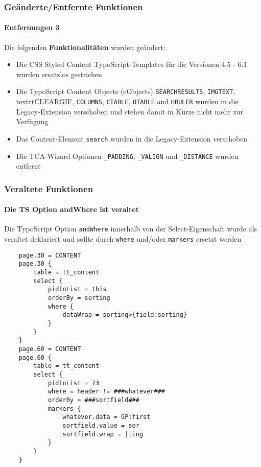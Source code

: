 \begin{frame}[fragile]
	\frametitle{Geänderte/Entfernte Funktionen}
	\framesubtitle{Entfernungen 3}

	Die folgenden \textbf{Funktionalitäten} wurden geändert:

	\begin{itemize}
		\item Die CSS Styled Content TypoScript-Templates für die Versionen 4.5 - 6.1 wurden ersatzlos gestrichen

		\item Die TypoScript Content Objects (cObjects) \texttt{SEARCHRESULTS}, \texttt{IMGTEXT}, texttt{CLEARGIF}, \texttt{COLUMNS}, \texttt{CTABLE}, \texttt{OTABLE} and \texttt{HRULER} wurden in die Legacy-Extension  verschoben und stehen damit in Kürze nicht mehr zur Verfügung

		\item Das Content-Element \texttt{search} wurden in die Legacy-Extension  verschoben

		\item Die TCA-Wizard Optionen \texttt{\_PADDING}, \texttt{\_VALIGN} und \texttt{\_DISTANCE} wurden entfernt
	\end{itemize}

\end{frame}


\begin{frame}[fragile]
	\frametitle{Veraltete Funktionen}
	\framesubtitle{Die TS Option andWhere ist veraltet}

	\lstset{
		basicstyle=\tiny\ttfamily
	}
	Die TypoScript Option \texttt{andWhere} innerhalb von der Select-Eigenschaft wurde als veraltet deklariert und sollte durch \texttt{where} und/oder \texttt{markers} ersetzt werden
	\begin{lstlisting}
	page.30 = CONTENT
	page.30 {
		table = tt_content
		select {
			pidInList = this
			orderBy = sorting
			where {
				dataWrap = sorting>{field:sorting}
			}
		}
	}
	page.60 = CONTENT
	page.60 {
		table = tt_content
		select {
			pidInList = 73
			where = header != ###whatever###
			orderBy = ###sortfield###
			markers {
				whatever.data = GP:first
				sortfield.value = sor
				sortfield.wrap = |ting
			}
		}
	}
	\end{lstlisting}

\end{frame}

